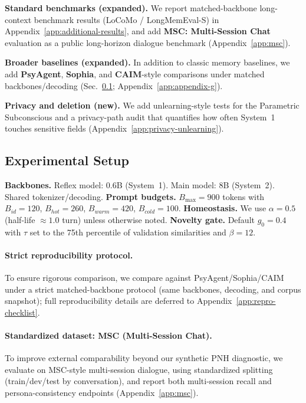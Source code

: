 \documentclass{article}
\begin{document}
\noindent\textbf{Standard benchmarks (expanded).} We report matched-backbone long-context benchmark results (LoCoMo / LongMemEval-S) in Appendix~\ref{app:additional-results}, and add \textbf{MSC: Multi-Session Chat} evaluation as a public long-horizon dialogue benchmark (Appendix~\ref{app:msc}).

\noindent\textbf{Broader baselines (expanded).} In addition to classic memory baselines, we add \textbf{PsyAgent}, \textbf{Sophia}, and \textbf{CAIM}-style comparisons under matched backbones/decoding (Sec.~\ref{sec:benchmarks-and-baselines}; Appendix~\ref{app:appendix-g}).

\noindent\textbf{Privacy and deletion (new).} We add unlearning-style tests for the Parametric Subconscious and a privacy-path audit that quantifies how often System~1 touches sensitive fields (Appendix~\ref{app:privacy-unlearning}).

\subsection{Experimental Setup}
\label{sec:benchmarks-and-baselines}
\textbf{Backbones.} Reflex model: 0.6B (System~1). Main model: 8B (System~2). Shared tokenizer/decoding.
\textbf{Prompt budgets.} $B_{\max}=900$ tokens with $B_{id}=120$, $B_{hot}=260$, $B_{warm}=420$, $B_{cold}=100$.
\textbf{Homeostasis.} We use $\alpha=0.5$ (half-life $\approx 1.0$ turn) unless otherwise noted.
\textbf{Novelty gate.} Default $g_0=0.4$ with $\tau$ set to the 75th percentile of validation similarities and $\beta=12$.

\paragraph{Strict reproducibility protocol.}
To ensure rigorous comparison, we compare against PsyAgent/Sophia/CAIM under a strict matched-backbone protocol (same backbones, decoding, and corpus snapshot); full reproducibility details are deferred to Appendix~\ref{app:repro-checklist}.

\paragraph{Standardized dataset: MSC (Multi-Session Chat).}
To improve external comparability beyond our synthetic PNH diagnostic, we evaluate on MSC-style multi-session dialogue, using standardized splitting (train/dev/test by conversation), and report both multi-session recall and persona-consistency endpoints (Appendix~\ref{app:msc}).
\end{document}
